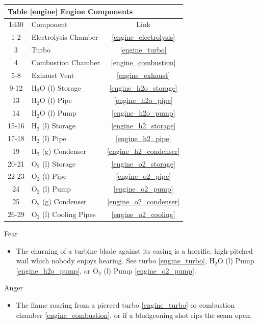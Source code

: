 \documentclass[a4paper]{article}
\begin{document}
\begin{tabular}[t]{| c | l | c |}
\toprule
\multicolumn{3}{|l|}{Table \ref{engine} Engine Components} \\
\toprule
1d30 & Component & Link \\
\midrule
1-2 & Electrolysis Chamber & \ref{engine_electrolysis} \\
3 & Turbo & \ref{engine_turbo} \\
4 & Combustion Chamber & \ref{engine_combustion} \\
5-8 & Exhaust Vent & \ref{engine_exhaust} \\
\midrule
9-12 & H$_2$O (l) Storage & \ref{engine_h2o_storage} \\
13 & H$_2$O (l) Pipe & \ref{engine_h2o_pipe} \\
14 & H$_2$O (l) Pump & \ref{engine_h2o_pump} \\
15-16 & H$_2$ (l) Storage & \ref{engine_h2_storage} \\
17-18 & H$_2$ (l) Pipe & \ref{engine_h2_pipe} \\
19 & H$_2$ (g) Condenser & \ref{engine_h2_condenser} \\
20-21 & O$_2$ (l) Storage & \ref{engine_o2_storage} \\
22-23 & O$_2$ (l) Pipe & \ref{engine_o2_pipe} \\
24 & O$_2$ (l) Pump & \ref{engine_o2_pump} \\
25 & O$_2$ (g) Condenser & \ref{engine_o2_condenser} \\
26-29 & O$_2$ (l) Cooling Pipes & \ref{engine_o2_cooling} \\
\bottomrule
\end{tabular}

\vspace{0.3cm}
\begin{minipage}[t]{0.4\linewidth}
Fear
\begin{itemize}
\item The churning of a turbine blade against its casing is a horrific, high-pitched wail which nobody enjoys hearing. See turbo \ref{engine_turbo}, H$_2$O (l) Pump \ref{engine_h2o_pump}, or O$_2$ (l) Pump \ref{engine_o2_pump}.
\end{itemize}
\end{minipage} 
\begin{minipage}[t]{0.4\linewidth}
Anger
\begin{itemize}
\item The flame roaring from a pierced turbo \ref{engine_turbo} or combustion chamber \ref{engine_combustion}, or if a bludgeoning shot rips the seam open. 
\end{itemize}
\end{minipage}
\end{document}
